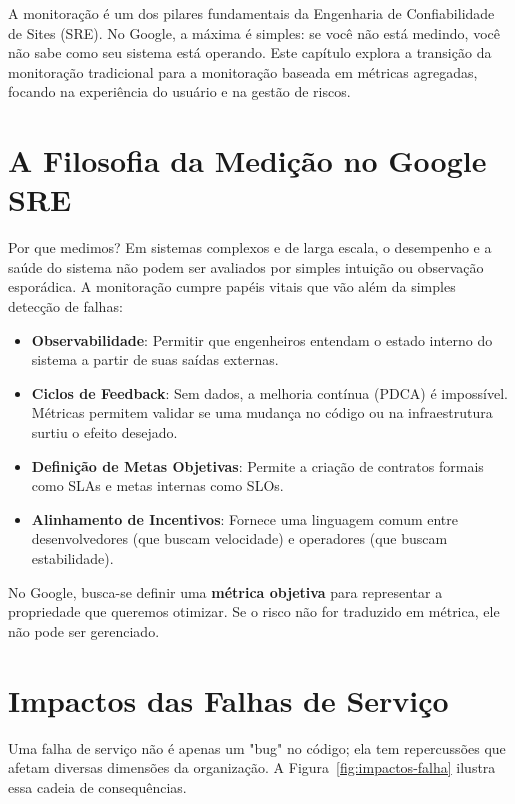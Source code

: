 \documentclass[12pt,a4paper]{report}
\begin{document}
A monitoração é um dos pilares fundamentais da Engenharia de Confiabilidade de Sites (SRE). No Google, a máxima é simples: se você não está medindo, você não sabe como seu sistema está operando. Este capítulo explora a transição da monitoração tradicional para a monitoração baseada em métricas agregadas, focando na experiência do usuário e na gestão de riscos.

\section{A Filosofia da Medição no Google SRE}

Por que medimos? Em sistemas complexos e de larga escala, o desempenho e a saúde do sistema não podem ser avaliados por simples intuição ou observação esporádica. A monitoração cumpre papéis vitais que vão além da simples detecção de falhas:

\begin{itemize}
    \item \textbf{Observabilidade}: Permitir que engenheiros entendam o estado interno do sistema a partir de suas saídas externas.
    \item \textbf{Ciclos de Feedback}: Sem dados, a melhoria contínua (PDCA) é impossível. Métricas permitem validar se uma mudança no código ou na infraestrutura surtiu o efeito desejado.
    \item \textbf{Definição de Metas Objetivas}: Permite a criação de contratos formais como SLAs e metas internas como SLOs.
    \item \textbf{Alinhamento de Incentivos}: Fornece uma linguagem comum entre desenvolvedores (que buscam velocidade) e operadores (que buscam estabilidade).
\end{itemize}

No Google, busca-se definir uma \textbf{métrica objetiva} para representar a propriedade que queremos otimizar. Se o risco não for traduzido em métrica, ele não pode ser gerenciado.

\section{Impactos das Falhas de Serviço}

Uma falha de serviço não é apenas um "bug" no código; ela tem repercussões que afetam diversas dimensões da organização. A Figura~\ref{fig:impactos-falha} ilustra essa cadeia de consequências.
\end{document}
